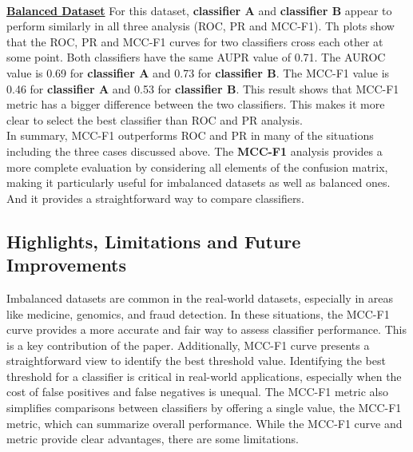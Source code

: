\documentclass[12pt, oneside]{amsart}
\theoremstyle{definition}
\theoremstyle{remark}
\numberwithin{equation}{section}
\begin{document}
\\
\underline{\textbf{Balanced Dataset}}
For this dataset, \textbf{classifier A} and \textbf{classifier B} appear to perform similarly in all three analysis (ROC, PR and MCC-F1). Th plots show that the ROC, PR and MCC-F1 curves for two classifiers cross each other at some point. Both classifiers have the same AUPR value of 0.71. The AUROC value is 0.69 for \textbf{classifier A} and 0.73 for \textbf{classifier B}. The MCC-F1 value is 0.46 for \textbf{classifier A} and 0.53 for \textbf{classifier B}. This result shows that MCC-F1 metric has a bigger difference between the two classifiers.  This makes it more clear to select the best classifier than ROC and PR analysis. \\

In summary, MCC-F1 outperforms ROC and PR in many of the situations including the three cases discussed above. The \textbf{MCC-F1} analysis provides a more complete evaluation by considering all elements of the confusion matrix, making it particularly useful for imbalanced datasets as well as balanced ones. And it provides a straightforward way to compare classifiers.

\subsection{Highlights, Limitations and Future Improvements}
Imbalanced datasets are common in the real-world datasets, especially in areas like medicine, genomics, and fraud detection. In these situations, the MCC-F1 curve provides a more accurate and fair way to assess classifier performance. This is a key contribution of the paper. Additionally, MCC-F1 curve presents a straightforward view to identify the best threshold value. Identifying the best threshold for a classifier is critical in real-world applications, especially when the cost of false positives and false negatives is unequal. The MCC-F1 metric also simplifies comparisons between classifiers by offering a single value, the MCC-F1 metric, which can summarize overall performance. While the MCC-F1 curve and metric provide clear advantages, there are some limitations. \\
\end{document}
